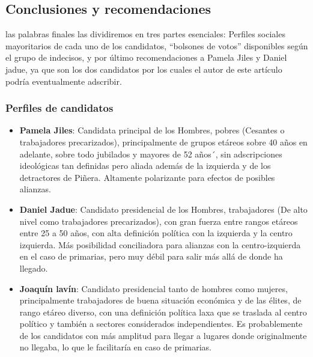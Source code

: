 \documentclass[
]{article}
\begin{document}
\newline

\hypertarget{conclusiones-y-recomendaciones}{%
\subsection{\texorpdfstring{\textbf{Conclusiones y
recomendaciones}}{Conclusiones y recomendaciones}}\label{conclusiones-y-recomendaciones}}

las palabras finales las dividiremos en tres partes esenciales: Perfiles
sociales mayoritarios de cada uno de los candidatos, ``bolsones de
votos'' disponibles según el grupo de indecisos, y por último
recomendaciones a Pamela Jiles y Daniel jadue, ya que son los dos
candidatos por los cuales el autor de este artículo podría eventualmente
adscribir.

\hypertarget{perfiles-de-candidatos}{%
\subsubsection{Perfiles de candidatos}\label{perfiles-de-candidatos}}

\begin{itemize}
\item
  \textbf{Pamela Jiles}: Candidata principal de los Hombres, pobres
  (Cesantes o trabajadores precarizados), principalmente de grupos
  etáreos sobre 40 años en adelante, sobre todo jubilados y mayores de
  52 años´, sin adscripciones ideológicas tan definidas pero aliada
  además de la izquierda y de los detractores de Piñera. Altamente
  polarizante para efectos de posibles alianzas.
\item
  \textbf{Daniel Jadue}: Candidato presidencial de los Hombres,
  trabajadores (De alto nivel como trabajadores precarizados), con gran
  fuerza entre rangos etáreos entre 25 a 50 años, con alta definición
  política con la izquierda y la centro izquierda. Más posibilidad
  conciliadora para alianzas con la centro-izquierda en el caso de
  primarias, pero muy débil para salir más allá de donde ha llegado.
\item
  \textbf{Joaquín lavín}: Candidato presidencial tanto de hombres como
  mujeres, principalmente trabajadores de buena situación económica y de
  las élites, de rango etáreo diverso, con una definición política laxa
  que se traslada al centro político y también a sectores considerados
  independientes. Es probablemente de los candidatos con más amplitud
  para llegar a lugares donde originalmente no llegaba, lo que le
  facilitaría en caso de primarias.
\end{itemize}
\end{document}
